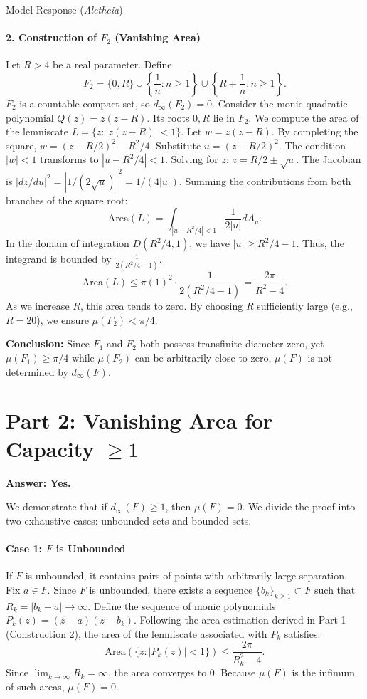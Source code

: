 \documentclass[11pt]{article}
\begin{document}
\begin{solution}{Model Response (\emph{Aletheia})}
\paragraph{2. Construction of $F_2$ (Vanishing Area)}

Let $R > 4$ be a real parameter. Define
\[ F_2 = \{0, R\} \cup \left\{ \frac{1}{n} : n \ge 1 \right\} \cup \left\{ R + \frac{1}{n} : n \ge 1 \right\}. \]
$F_2$ is a countable compact set, so $d_\infty(F_2) = 0$.
Consider the monic quadratic polynomial $Q(z) = z(z-R)$. Its roots $0, R$ lie in $F_2$.
We compute the area of the lemniscate $L = \{z : |z(z-R)| < 1\}$.
Let $w = z(z-R)$. By completing the square, $w = (z - R/2)^2 - R^2/4$.
Substitute $u = (z - R/2)^2$. The condition $|w| < 1$ transforms to $|u - R^2/4| < 1$.
Solving for $z$: $z = R/2 \pm \sqrt{u}$.
The Jacobian is $|dz/du|^2 = |1/(2\sqrt{u})|^2 = 1/(4|u|)$.
Summing the contributions from both branches of the square root:
\[ \text{Area}(L) = \int_{|u - R^2/4| < 1} \frac{1}{2|u|} dA_u. \]
In the domain of integration $D(R^2/4, 1)$, we have $|u| \ge R^2/4 - 1$. Thus, the integrand is bounded by $\frac{1}{2(R^2/4 - 1)}$.
\[ \text{Area}(L) \le \pi(1)^2 \cdot \frac{1}{2(R^2/4 - 1)} = \frac{2\pi}{R^2 - 4}. \]
As we increase $R$, this area tends to zero. By choosing $R$ sufficiently large (e.g., $R=20$), we ensure $\mu(F_2) < \pi/4$.

\textbf{Conclusion:}
Since $F_1$ and $F_2$ both possess transfinite diameter zero, yet $\mu(F_1) \ge \pi/4$ while $\mu(F_2)$ can be arbitrarily close to zero, $\mu(F)$ is not determined by $d_\infty(F)$.

\section{Part 2: Vanishing Area for Capacity $\ge 1$}

\textbf{Answer: Yes.}

We demonstrate that if $d_\infty(F) \ge 1$, then $\mu(F) = 0$. We divide the proof into two exhaustive cases: unbounded sets and bounded sets.

\paragraph{Case 1: $F$ is Unbounded}

If $F$ is unbounded, it contains pairs of points with arbitrarily large separation.
Fix $a \in F$. Since $F$ is unbounded, there exists a sequence $\{b_k\}_{k \ge 1} \subset F$ such that $R_k = |b_k - a| \to \infty$.
Define the sequence of monic polynomials $P_k(z) = (z - a)(z - b_k)$.
Following the area estimation derived in Part 1 (Construction 2), the area of the lemniscate associated with $P_k$ satisfies:
\[ \text{Area}(\{z : |P_k(z)| < 1\}) \le \frac{2\pi}{R_k^2 - 4}. \]
Since $\lim_{k \to \infty} R_k = \infty$, the area converges to 0.
Because $\mu(F)$ is the infimum of such areas, $\mu(F) = 0$.


\end{solution}
\end{document}
